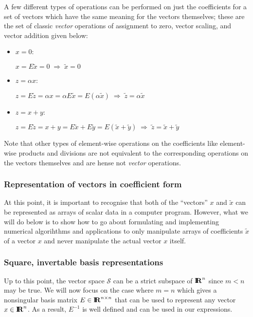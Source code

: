 A few different types of operations can be performed on just the coefficients
for a set of vectors which have the same meaning for the vectors themselves;
these are the set of classic {}\textit{vector} operations of assignment to
zero, vector scaling, and vector addition given below:

\begin{itemize}

{}\item $x = 0$:

$x = E \tilde{x} = 0 \; \Rightarrow \; \tilde{x} = 0$ 

{}\item $z = \alpha x$:

$z = E \tilde{z} = \alpha x = \alpha E \tilde{x} = E ( \alpha
\tilde{x} ) \; \Rightarrow \; \tilde{z} = \alpha \tilde{x}$

{}\item $z = x + y$:

$z = E \tilde{z} = x + y = E \tilde{x} + E \tilde{y} = E ( \tilde{x} +
\tilde{y} ) \; \Rightarrow \; \tilde{z} = \tilde{x} + \tilde{y}$

\end{itemize}

Note that other types of element-wise operations on the coefficients like
element-wise products and divisions are not equivalent to the corresponding
operations on the vectors themselves and are hense not {}\textit{vector}
operations.

\subsubsection{Representation of vectors in coefficient form}

At this point, it is important to recognise that both of the ``vectors'' $x$
and $\tilde{x}$ can be represented as arrays of scalar data in a computer
program.  However, what we will do below is to show how to go about
formulating and implementing numerical algorihthms and applications to only
manipulate arrays of coefficients $\tilde{x}$ of a vector $x$ and never
manipulate the actual vector $x$ itself.

\subsubsection{Square, invertable basis representations}

Up to this point, the vector space $\mathcal{S}$ can be a strict subspace of
$\mbox{\textbf{I}}\hspace{-0.6ex}\mbox{\textbf{R}}^n$ since $m < n$ may be true.  We will now focus on the case where $m =
n$ which gives a nonsingular basis matrix $E\in\mbox{\textbf{I}}\hspace{-0.6ex}\mbox{\textbf{R}}^{n\times{}n}$ that can be
used to represent any vector $x\in\mbox{\textbf{I}}\hspace{-0.6ex}\mbox{\textbf{R}}^n$.  As a result, $E^{-1}$ is well
defined and can be used in our expressions.

